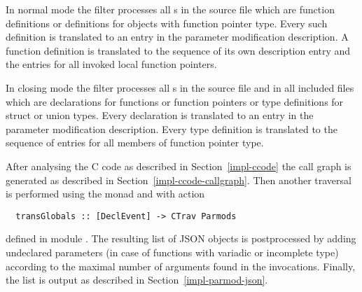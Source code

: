 In normal mode the filter processes all s in the source file which are function
definitions or definitions for objects with function pointer type. Every such definition is translated to an
entry in the parameter modification description. A function definition is translated to the sequence of its
own description entry and the entries for all invoked local function pointers.

In closing mode the filter processes all s in the source file and in all included files which
are declarations for functions or function pointers
or type definitions for struct or union types. Every declaration is translated to an entry in the parameter
modification description. Every type definition is translated to the sequence of entries for all members of
function pointer type.

After analysing the C code as described in Section~\ref{impl-ccode} the call graph is generated as described
in Section~\ref{impl-ccode-callgraph}. Then another traversal is performed using the  monad and
 with action
\begin{verbatim}
  transGlobals :: [DeclEvent] -> CTrav Parmods
\end{verbatim}
defined in module . The resulting list of JSON objects is postprocessed by adding
undeclared parameters (in case of functions with variadic or incomplete type) according to the maximal number
of arguments found in the invocations. Finally, the list is output as described in Section~\ref{impl-parmod-json}.





